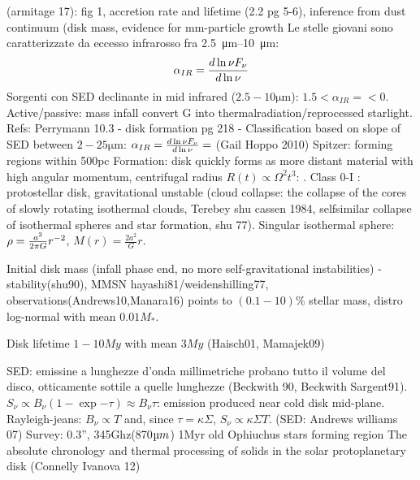 \begin{workout}
(armitage 17): fig 1, accretion rate and lifetime (2.2 pg 5-6), inference from dust continuum (disk mass, evidence for mm-particle growth
Le stelle giovani sono caratterizzate da eccesso infrarosso fra \SIrange{2.5}{10}{\micro\meter}:
\begin{equation}
\alpha_{IR}=\frac{d \ln{\nu F_{\nu}}}{d \ln{\nu}}
\end{equation}
Sorgenti con SED declinante in mid infrared ($2.5-10\si{\micro\meter}$): $1.5<\alpha_{IR}=<0$. Active/passive: mass infall convert G into thermalradiation/reprocessed starlight.
Refs: Perrymann 10.3 - disk formation pg 218 - 
Classification based on slope of SED between $2-25\si{\micro\meter}$: $\alpha_{IR}=\frac{d \ln{\nu F_{\nu}}}{d \ln{\nu}}=$ (Gail Hoppo 2010)
Spitzer: forming regions within 500pc
Formation: disk quickly forms as more distant material with high angular momentum, centrifugal radius $R(t)\propto\Omega^2 t^3$: . Class 0-I : protostellar disk, gravitational unstable (cloud collapse: the collapse of the cores of slowly rotating isothermal clouds, Terebey shu cassen 1984, selfsimilar collapse of isothermal spheres and star formation, shu 77). Singular isothermal sphere: $\rho=\frac{a^2}{2\pi G}r^{-2}$, $M(r)=\frac{2a^2}{G}r$.
\end{workout}

\begin{workout}

Initial disk mass
(infall phase end, no more self-gravitational instabilities) - stability(shu90), MMSN hayashi81/weidenshilling77, observations(Andrews10,Manara16) points to $(0.1-10)\%$ stellar mass, distro log-normal with mean $0.01M_*$.

{Disk lifetime}
$1-10My$ with mean $3My$ (Haisch01, Mamajek09)

\end{workout}

\begin{workout}
SED: emissine a lunghezze d'onda millimetriche probano tutto il volume del disco, otticamente sottile a quelle lunghezze (Beckwith 90, Beckwith Sargent91).
$S_{\nu}\propto B_{\nu}(1-\exp{-\tau})\approx B_{\nu}\tau$: emission produced near cold disk mid-plane.
Rayleigh-jeans: $B_{\nu}\propto T$ and, since $\tau=\kappa\Sigma$, $S_{\nu}\propto \kappa\Sigma T$.
(SED: Andrews williams 07)
Survey: 0.3'', 345Ghz(870$\micro m$) 1Myr old Ophiuchus stars forming region
The absolute chronology and thermal processing of solids in the solar protoplanetary disk (Connelly Ivanova 12)
\end{workout}

